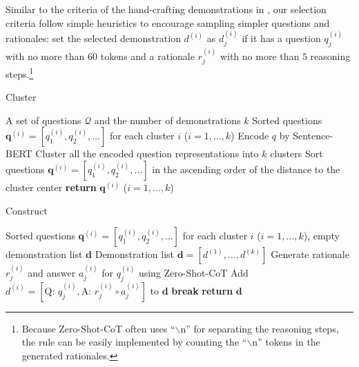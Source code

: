 Similar to the criteria of the hand-crafting demonstrations in \citet{cot_wei}, our selection criteria follow simple heuristics to encourage sampling simpler questions and rationales: set the selected demonstration $d^{(i)}$ as $d_j^{(i)}$ if it has a question $q_j^{(i)}$ with no more than $60$ tokens and a rationale $r_j^{(i)}$ with no more than $5$ reasoning steps.\footnote{Because Zero-Shot-CoT often uses ``$\backslash$n'' for separating the reasoning steps, the rule can be easily implemented by counting the ``$\backslash$n'' tokens in the generated rationales.} 

\begin{minipage}{0.46\textwidth}
  \begin{algorithm}[H]\small
    \caption{Cluster}\label{alg:cluster}
\begin{algorithmic}[1]
\Require A set of questions $\mathcal{Q}$ and the number of demonstrations $k$
\Ensure Sorted questions $\mathbf{q}^{(i)} = [q_1^{(i)}, q_2^{(i)}, \ldots]$ for each cluster $i$ ($i = 1, \ldots, k$)
\State Encode $q$ by Sentence-BERT
\EndFor
\State Cluster all the encoded question representations into $k$ clusters
\State Sort questions $\mathbf{q}^{(i)} = [q_1^{(i)}, q_2^{(i)}, \ldots]$ in the ascending order of the distance to the cluster center
\EndFor
\State \textbf{return} $\mathbf{q}^{(i)}$ ($i = 1, \ldots, k$)
\EndProcedure%
\end{algorithmic}
  \end{algorithm}
\end{minipage}
  \hfill
\begin{minipage}{0.52\textwidth}
  \begin{algorithm}[H]\small
  \caption{Construct}\label{alg:construct}
\begin{algorithmic}[1]
\Require Sorted questions $\mathbf{q}^{(i)} = [q_1^{(i)}, q_2^{(i)}, \ldots]$ for each cluster $i$ ($i = 1, \ldots, k$), empty demonstration list $\mathbf{d}$
\Ensure Demonstration list $\mathbf{d} = [d^{(1)}, \ldots, d^{(k)}]$ 
\State Generate rationale $r_j^{(i)}$ and answer $a_j^{(i)}$ for $q_j^{(i)}$ using Zero-Shot-CoT
    \State Add $d^{(i)} = [\text{Q: } q_j^{(i)}, \text{A: } r_j^{(i)} \circ a_j^{(i)}]$ to  $\mathbf{d}$
    \State \textbf{break}
\EndIf
\EndFor
\EndFor
\State \textbf{return} $\mathbf{d}$ 
\EndProcedure%
\end{algorithmic}
  \end{algorithm}
\end{minipage}

